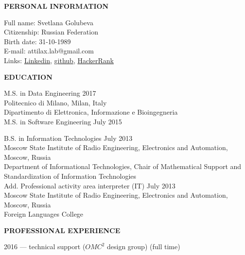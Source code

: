 \documentclass[a4paper,12pt,fullpage]{article}
\begin{document}
\begin{center}
	\textbf{PERSONAL INFORMATION\\}
\end{center}

Full name: \hfill Svetlana Golubeva\\
Citizenship: \hfill Russian Federation\\
Birth date: \hfill 31-10-1989\\
E-mail: \hfill attilax.lab@gmail.com \\
Links: \hfill  \href{}{Linkedin}, \href{https://github.com/attillax}{github}, 
\href{https://www.hackerrank.com/attillax}{HackerRank}\\

\begin{center}
	\textbf{EDUCATION}
\end{center}	

M.S. in Data Engineering \hfill 2017\\
Politecnico di Milano, Milan, Italy\\
Dipartimento di Elettronica, Informazione e Bioingegneria\\

M.S. in Software Engineering \hfill July 2015

B.S. in Information Technologies \hfill July 2013\\
Moscow State Institute of Radio Engineering, Electronics and Automation, Moscow, Russia\\
Department of Informational Technologies, Chair of Mathematical Support and Standardization of Information Technologies\\

Add. Professional activity area interpreter (IT) \hfill July 2013\\
Moscow State Institute of Radio Engineering, Electronics and Automation, Moscow, Russia\\
Foreign Languages College\\

\begin{center}
	\textbf{PROFESSIONAL EXPERIENCE}
\end{center}	
2016 --- technical support ($ OMC^{2} $ design group) (full time) \\
\end{document}
